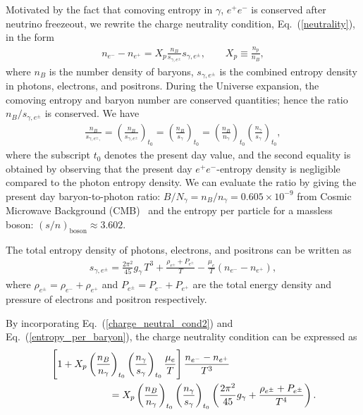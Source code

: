 Motivated by the fact that comoving entropy in $\gamma$, $e^+e^-$ is conserved after neutrino freezeout, we rewrite the charge neutrality condition, Eq.~(\ref{neutrality}), in the form
\begin{align}\label{charge_neutral_cond2}
n_{e^-}-n_{{e^+}}=X_p\frac{n_B}{s_{\gamma,e^\pm}} s_{\gamma,e^\pm},\qquad X_p\equiv\frac{n_p}{n_B},
\end{align}
where $n_B$ is the number density of baryons, $s_{\gamma,e^\pm}$ is the combined entropy density in photons, electrons, and positrons. During the Universe expansion, the comoving entropy and baryon number are conserved quantities; hence the ratio $n_B/s_{\gamma,e^\pm}$ is conserved. We have
\begin{align}
\frac{n_B}{s_{\gamma,e^\pm,}}=\left(\frac{n_B}{s_{\gamma,e^\pm}}\right)_{t_0}\!\!\!\!=\left(\frac{n_B}{s_{\gamma}}\right)_{t_0}\!\!\!\!=\left(\frac{n_B}{n_\gamma}\right)_{t_0}\left(\frac{n_\gamma}{s_{\gamma}}\right)_{t_0},
\end{align}
where the subscript $t_0$ denotes the present day value, and the second equality is obtained by observing that the present day $e^+e^-$-entropy density is negligible compared to the photon entropy density. We can evaluate the ratio by giving the present day baryon-to-photon ratio: $B/N_\gamma =n_B/n_\gamma= 0.605\times10^{-9}$ from Cosmic Microwave Background (CMB)~\cite{ParticleDataGroup:2022pth} and the entropy per particle for a massless boson: $(s/n)_{\mathrm{boson}}\approx 3.602$.

The total entropy density of photons, electrons, and positrons can be written as
\begin{align}\label{entropy_per_baryon}
s_{\gamma,e^\pm}=\frac{2\pi^2}{45}g_\gamma\,T^3+\frac{\rho_{e^\pm}+P_{e^\pm}}{T}-\frac{\mu_e}{T}(n_{e^-}-n_{{e^+}}),
 \end{align}
where $ \rho_{e^\pm}=\rho_{e^-}+\rho_{e^+}$ and $P_{e^\pm}=P_{e^-}+P_{{e^+}}$ are the total energy density and pressure of electrons and positron respectively.

By incorporating Eq.~(\ref{charge_neutral_cond2}) and Eq.~(\ref{entropy_per_baryon}), the charge neutrality condition can be expressed as
\begin{align}\label{charge_neutral_cond3}
 &\left[1+X_p\left(\frac{n_B}{n_\gamma}\right)_{t_0}\left(\frac{n_\gamma}{s_{\gamma}}\right)_{t_0}\frac{\mu_e}{T}\right]\frac{n_{e^-}-n_{{e^+}}}{T^3}\notag\\
 &\qquad\qquad\qquad=X_p\left(\frac{n_B}{n_\gamma}\right)_{t_0}\left(\frac{n_\gamma}{s_{\gamma}}\right)_{t_0} \left(\frac{2\pi^2}{45}g_\gamma+\frac{\rho_{e^\pm}+P_{e^\pm}}{T^4}\right).
\end{align}

